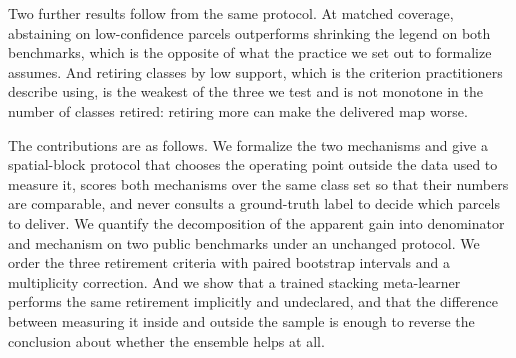 Two further results follow from the same protocol. At matched coverage, abstaining on
low-confidence parcels outperforms shrinking the legend on both benchmarks, which is the opposite
of what the practice we set out to formalize assumes. And retiring classes by low support, which is
the criterion practitioners describe using, is the weakest of the three we test and is not monotone
in the number of classes retired: retiring more can make the delivered map worse.

The contributions are as follows. We formalize the two mechanisms and give a spatial-block protocol
that chooses the operating point outside the data used to measure it, scores both mechanisms over
the same class set so that their numbers are comparable, and never consults a ground-truth label to
decide which parcels to deliver. We quantify the decomposition of the apparent gain into
denominator and mechanism on two public benchmarks under an unchanged protocol. We order the three
retirement criteria with paired bootstrap intervals and a multiplicity correction. And we show that
a trained stacking meta-learner performs the same retirement implicitly and undeclared, and that
the difference between measuring it inside and outside the sample is enough to reverse the
conclusion about whether the ensemble helps at all.
